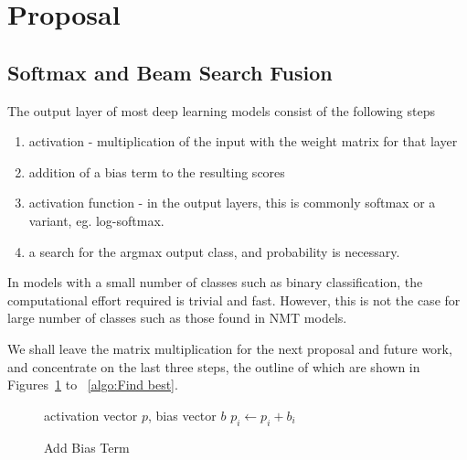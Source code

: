 \documentclass[11pt,a4paper]{article}
\begin{document}
\section{Proposal}
\label{sec:Proposal}

\subsection{Softmax and Beam Search Fusion}

The output layer of most deep learning models consist of the following steps
\begin{enumerate}
   \item \vspace{-2 mm} activation - multiplication of the input with the weight matrix for that layer
   \item \vspace{-2 mm} addition of a bias term to the resulting scores
   \item \vspace{-2 mm} activation function - in the output layers, this is commonly softmax or a variant, eg. log-softmax.
   \item \vspace{-2 mm} a search for the argmax output class, and probability is necessary.
\end{enumerate}

In models with a small number of classes such as binary classification, the computational effort required is trivial and fast. However, this is not the case for large number of classes such as those found in NMT models.

We shall leave the matrix multiplication for the next proposal and future work, and concentrate on the last three steps, the outline of which are shown in Figures~\ref{algo:Add Bias Term} to ~\ref{algo:Find best}.

\begin{figure} [h]
\begin{algorithmic}
\REQUIRE activation vector $p$, bias vector $b$
  \STATE $p_i \gets p_i + b_i$
\ENDFOR 
\end{algorithmic}
\caption{Add Bias Term}
\label{algo:Add Bias Term}
\end{figure}
\end{document}
